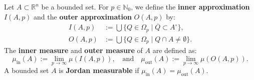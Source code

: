 \begin{theorem}
Let $A \subset \mathbb{R}^n$ be a bounded set. For $p \in \mathbb{N}_0$, we define the \textbf{inner approximation} $I(A, p)$ and the \textbf{outer approximation} $O(A, p)$ by:
\begin{align*}
I(A, p) &:= \bigcup \{ Q \in \Omega_p \mid \overline{Q} \subset A^\circ \}, \\
O(A, p) &:= \bigcup \{ Q \in \Omega_p \mid Q \cap A \neq \emptyset \}.
\end{align*}
The \textbf{inner measure} and \textbf{outer measure} of $A$ are defined as:
\[
\mu_{\text{in}}(A) := \lim_{p \to \infty} \mu(I(A, p)), \quad \text{and} \quad \mu_{\text{out}}(A) := \lim_{p \to \infty} \mu(O(A, p)).
\]
A bounded set $A$ is \textbf{Jordan measurable} if $\mu_{\text{in}}(A) = \mu_{\text{out}}(A)$.
\end{theorem}

\setcounter{section}{\value{savedSec}}
\setcounter{theorem}{\value{savedThm}}

